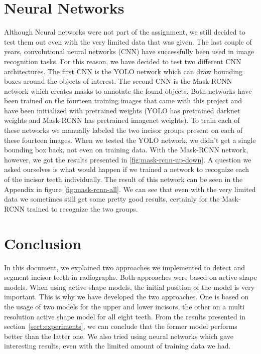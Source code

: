 \documentclass[a4paper]{article}
\begin{document}
\section{Neural Networks}
\label{sect:nns}
Although Neural networks were not part of the assignment, we still decided to test them out even with the very limited data that was given.
The last couple of years, convolutional neural networks (CNN) have successfully been used in image recognition tasks.
For this reason, we have decided to test two different CNN architectures.
The first CNN is the YOLO\cite{yolov3} network which can draw bounding boxes around the objects of interest.
The second CNN is the Mask-RCNN\cite{MASK-RCNN} network which creates masks to annotate the found objects.
Both networks have been trained on the fourteen training images that came with this project and have been initialized with pretrained weights (YOLO has pretrained darknet weights and Mask-RCNN has pretrained imagenet weights).
To train each of these networks we manually labeled the two incisor groups present on each of these fourteen images.
When we tested the YOLO network, we didn't get a single bounding box back, not even on training data.
With the Mask-RCNN network, however, we got the results presented in \ref{fig:mask-rcnn-up-down}.
A question we asked ourselves is what would happen if we trained a network to recognize each of the incisor teeth individually.
The result of this network can be seen in the Appendix in figure \ref{fig:mask-rcnn-all}.
We can see that even with the very limited data we sometimes still get some pretty good results, certainly for the Mask-RCNN trained to recognize the two groups.

\section{Conclusion}
\label{sect:conclusion}
In this document, we explained two approaches we implemented to detect and segment incisor teeth in radiographs. 
Both approaches were based on active shape models.
When using active shape models, the initial position of the model is very important.
This is why we have developed the two approaches.
One is based on the usage of two models for the upper and lower incisors, the other on a multi resolution active shape model for all eight teeth.
From the results presented in section~\ref{sect:experiments}, we can conclude that the former model performs better than the latter one.
We also tried using neural networks which gave interesting results, even with the limited amount of training data we had.
\end{document}
